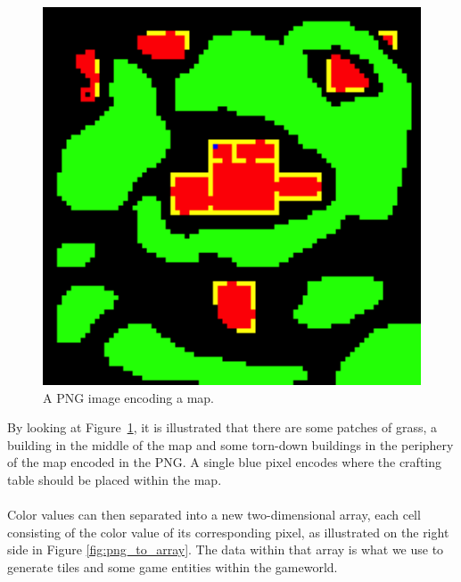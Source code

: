 \begin{figure}[H]
    \centering
    \includegraphics[width=1\textwidth]{figures/generating_levels/map.png}
    \caption{A PNG image encoding a map.}
    \label{fig:png_map}
\end{figure}
By looking at Figure~\ref{fig:png_map}, it is illustrated that there are some patches of grass, a building in the middle of the map and some torn-down buildings in the periphery of the map encoded in the PNG.
A single blue pixel encodes where the crafting table should be placed within the map.
\\\\
Color values can then separated into a new two-dimensional array, each cell consisting of the color value of its corresponding pixel, as illustrated on the right side in Figure \ref{fig:png_to_array}.
The data within that array is what we use to generate tiles and some game entities within the gameworld.
